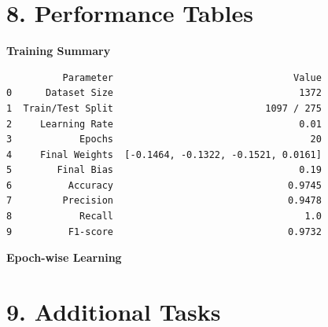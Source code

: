 \documentclass[11pt]{article}
\begin{document}

\section*{8. Performance Tables}

\textbf{Training Summary}

\begin{verbatim}
          Parameter                                Value
0      Dataset Size                                 1372
1  Train/Test Split                           1097 / 275
2     Learning Rate                                 0.01
3            Epochs                                   20
4     Final Weights  [-0.1464, -0.1322, -0.1521, 0.0161]
5        Final Bias                                 0.19
6          Accuracy                               0.9745
7         Precision                               0.9478
8            Recall                                  1.0
9          F1-score                               0.9732

\end{verbatim}

\vspace{3mm}

\textbf{Epoch-wise Learning}



\section*{9. Additional Tasks}
\end{document}
